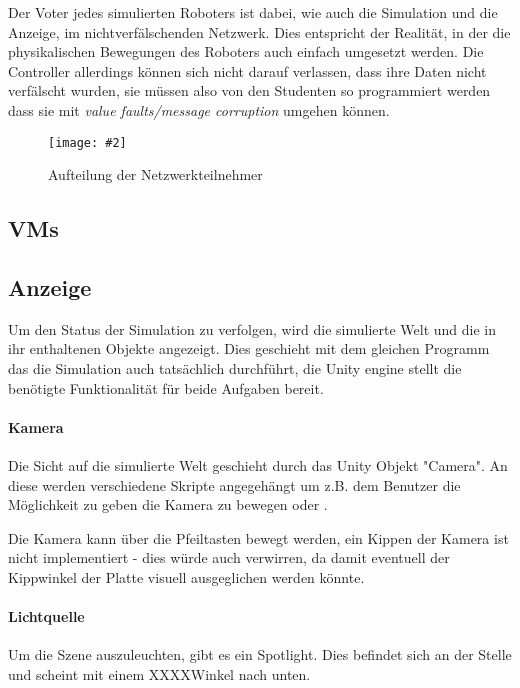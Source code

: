 \documentclass[
    12pt,
    bibliography=totoc,
    ngerman,
	enabledeprecatedfontcommands
]{scrartcl}
\newcommand{\includevisio}[2][]{\texttt{[image: \#2]}}
\begin{document}
Der Voter jedes simulierten Roboters ist dabei, wie auch die Simulation und die Anzeige, im nichtverf{\"{a}}lschenden Netzwerk. Dies entspricht der Realit{\"{a}}t, in der die physikalischen Bewegungen
des Roboters auch einfach umgesetzt werden. Die Controller allerdings k{\"{o}}nnen sich nicht darauf verlassen, dass ihre Daten nicht verf{\"{a}}lscht wurden, sie m{\"{u}}ssen also von den Studenten so
programmiert werden dass sie mit \textit{value faults/message corruption}\cite{richling-ass} umgehen k{\"{o}}nnen.

\begin{figure}
	\centering
	\includevisio[width=\textwidth]{Netzwerk}
	\caption{Aufteilung der Netzwerkteilnehmer}
	\label{fig:network}
\end{figure}

\subsection{VMs}

\subsection{Anzeige}\label{graphics}
Um den Status der Simulation zu verfolgen, wird die simulierte Welt und die in ihr enthaltenen Objekte angezeigt. Dies geschieht mit dem gleichen Programm das die Simulation auch tats{\"{a}}chlich
durchf{\"{u}}hrt, die Unity engine stellt die ben{\"{o}}tigte Funktionalit{\"{a}}t f{\"{u}}r beide Aufgaben bereit.

\paragraph{Kamera} Die Sicht auf die simulierte Welt geschieht durch das Unity Objekt "Camera". An diese werden verschiedene Skripte angegeh{\"{a}}ngt um z.B. dem Benutzer die M{\"{o}}glichkeit zu
geben die Kamera zu bewegen oder .

Die Kamera kann {\"{u}}ber die Pfeiltasten bewegt werden, ein Kippen der Kamera ist nicht implementiert - dies w{\"{u}}rde auch verwirren, da damit eventuell der Kippwinkel der
Platte visuell ausgeglichen werden k{\"{o}}nnte.

\paragraph{Lichtquelle} Um die Szene auszuleuchten, gibt es ein Spotlight. Dies befindet sich an der Stelle  und scheint mit einem XXXX\textdegree Winkel nach unten.
\end{document}
